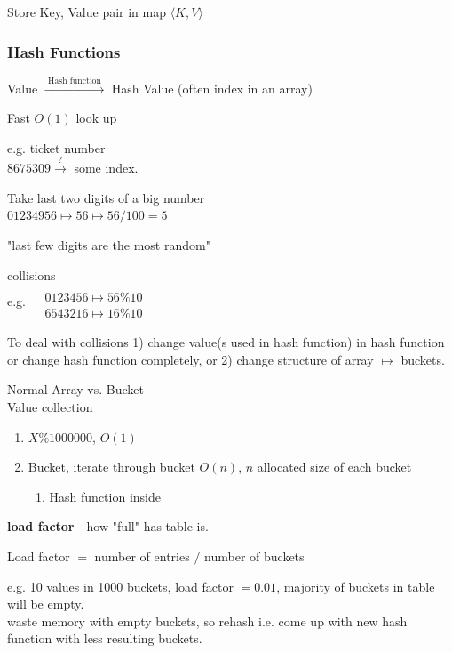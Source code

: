 \documentclass[10pt]{amsart}
\begin{document}
\begin{multicols*}{2}
Store Key, Value pair in map $\langle K, V \rangle$

\subsubsection{Hash Functions}

Value $\xrightarrow{ \text{ Hash function } }$ Hash Value (often index in an array)

Fast $O(1)$ look up

e.g. ticket number  \\
$8675309 \xrightarrow{?} $ some index.

Take last two digits of a big number \\
$01234956 \mapsto 56 \mapsto 56/100 = 5$

"last few digits are the most random"

collisions \\
e.g. 
$\begin{aligned} 
& \quad \\ 
& 0123456 \mapsto 56 \% 10 \\
& 6543216 \mapsto 16 \% 10 \end{aligned}$ 

To deal with collisions
1) change value(s used in hash function) in hash function or change hash function completely, or 2) change structure of array $\mapsto $ buckets.

Normal Array vs. Bucket \\
Value \phantom{ Array vs. } collection \\

\begin{enumerate}
	\item $ X \% 1000000$, $O(1)$ 
	\item Bucket, iterate through bucket $O(n)$, $n$ allocated size of each bucket
	\begin{enumerate}
		\item  Hash function inside 
	\end{enumerate}
\end{enumerate}

\textbf{load factor} - how "full" has table is.

Load factor $=$ number of entries $/$ number of buckets 

e.g. 10 values in 1000 buckets, load factor $=0.01$, majority of buckets in table will be empty. \\
waste memory with empty buckets, so rehash i.e. come up with new hash function with less resulting buckets. \\


\end{multicols*}
\end{document}
